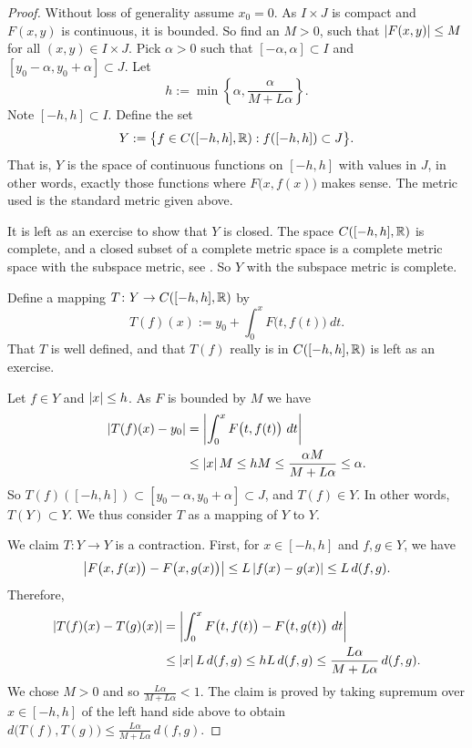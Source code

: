 \begin{proof}
Without loss of generality assume $x_0 =0$.
As $I \times J$ is compact and
$F(x,y)$ is continuous, it is bounded.
So find an $M > 0$, such that
$\left\lvert {F(x,y)} \right\rvert \leq M$ for all $(x,y) \in I\times J$.
Pick $\alpha > 0$ such that
$[-\alpha,\alpha] \subset I$ and $[y_0-\alpha, y_0 + \alpha] \subset J$.
Let
\begin{equation*}
h := \min \left\{ \alpha, \frac{\alpha}{M+L\alpha} \right\} .
\end{equation*}
Note $[-h,h] \subset I$.  Define the set
\begin{equation*}
Y := \bigl\{ f \in C([-h,h],{\mathbb{R}}) : f([-h,h]) \subset J \bigr\} .
\end{equation*}
That is, $Y$ is the space of continuous functions on $[-h,h]$ with values in
$J$, in other words,
exactly those functions where $F\bigl(x,f(x)\bigr)$ makes sense.
The metric used is the standard metric given above.

It is left as an exercise to show that $Y$ is closed.
The space $C([-h,h],{\mathbb{R}})$ is complete, and
a closed subset of a complete metric space is a complete metric space with
the subspace metric, see .  So $Y$ with the subspace metric is
complete.

Define a mapping
$T \colon Y \to C([-h,h],{\mathbb{R}})$ by
\begin{equation*}
T(f)(x)
:=
y_0 + \int_0^x F\bigl(t,f(t)\bigr)~dt .
\end{equation*}
That $T$ is well defined, and that $T(f)$ really is in $C([-h,h],{\mathbb{R}})$
is left as an exercise.

Let $f \in Y$ and $\left\lvert {x} \right\rvert \leq h$.
As $F$ is bounded by $M$ we have
\begin{equation*}
\begin{split}
\left\lvert {T(f)(x) - y_0} \right\rvert
&= \left\lvert {\int_0^x F\bigl(t,f(t)\bigr)~dt} \right\rvert \\
& \leq 
\left\lvert {x} \right\rvert M \leq hM \leq \frac{\alpha M}{M+ L\alpha} \leq \alpha .
\end{split}
\end{equation*}
So $T(f)([-h,h]) \subset [y_0-\alpha,y_0+\alpha] \subset J$, and
$T(f) \in Y$.  In other words, $T(Y) \subset Y$.  We thus consider
$T$ as a mapping of $Y$ to $Y$.

We claim $T \colon Y \to Y$ is a contraction.  First, for $x \in [-h,h]$
and $f,g \in Y$, we have
\begin{equation*}
\left\lvert {F\bigl(x,f(x)\bigr) - F\bigl(x,g(x)\bigr)} \right\rvert \leq
L\left\lvert {f(x)- g(x)} \right\rvert \leq L \, d(f,g) .
\end{equation*}
Therefore,
\begin{equation*}
\begin{split}
\left\lvert {T(f)(x) - T(g)(x)} \right\rvert
&= \left\lvert {\int_0^x F\bigl(t,f(t)\bigr) - F\bigl(t,g(t)\bigr)~dt} \right\rvert \\
& \leq \left\lvert {x} \right\rvert L \, d(f,g)
 \leq h L\, d(f,g)
 \leq \frac{L\alpha}{M+L\alpha} \, d(f,g) .
\end{split}
\end{equation*}
We chose $M > 0$ and so
$\frac{L\alpha}{M+L\alpha} < 1$.  The claim is proved by
taking supremum over $x \in [-h,h]$ of the left hand side above to obtain
$d\bigl(T(f),T(g)\bigr) \leq \frac{L\alpha}{M+L\alpha} \, d(f,g)$.


\end{proof}
